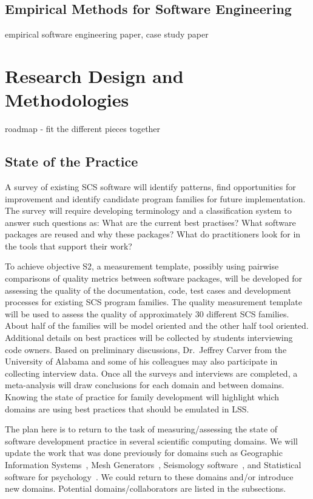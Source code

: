 \documentclass[12pt]{article}
\begin{document}
\subsection{Empirical Methods for Software Engineering}

empirical software engineering paper, case study paper

\section{Research Design and Methodologies}

roadmap - fit the different pieces together

\subsection{State of the Practice}

A survey of existing SCS software will identify patterns, find opportunities for
improvement and identify candidate program families for future implementation.
The survey will require developing terminology and a classification system to
answer such questions as: What are the current best practises?  What software
packages are reused and why these packages?  What do practitioners look for in
the tools that support their work?

To achieve objective S2, a measurement template, possibly using pairwise
comparisons of quality metrics between software packages, will be developed for
assessing the quality of the documentation, code, test cases and development
processes for existing SCS program families.  The quality measurement template
will be used to assess the quality of approximately 30 different SCS families.
About half of the families will be model oriented and the other half tool
oriented.  Additional details on best practices will be collected by students
interviewing code owners.  Based on preliminary discussions, Dr.\ Jeffrey Carver
from the University of Alabama and some of his colleagues may also participate
in collecting interview data. Once all the surveys and interviews are
completed, a meta-analysis will draw conclusions for each domain and between
domains.  Knowing the state of practice for family development will highlight
which domains are using best practices that should be emulated in LSS.

The plan here is to return to the task of measuring/assessing the state of
software development practice in several scientific computing domains.  We will
update the work that was done previously for domains such as Geographic
Information Systems~\cite{SmithEtAl2018_arXivGIS}, Mesh
Generators~\cite{SmithEtAl2016}, Seismology software~\cite{SmithEtAl2018}, and
Statistical software for psychology~\cite{SmithEtAl2018_StatSoft}.  We could
return to these domains and/or introduce new domains.  Potential domains/collaborators
are listed in the subsections.
\end{document}
